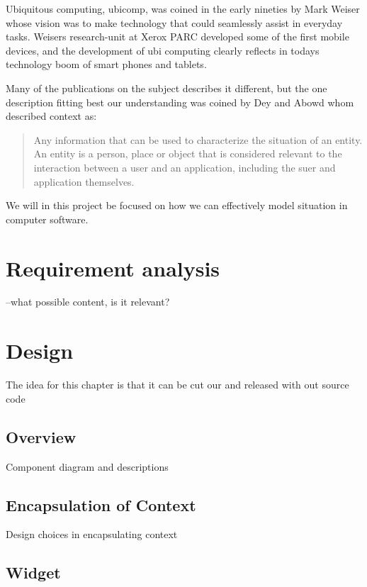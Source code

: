\documentclass[]{report}
\begin{document}
Ubiquitous computing, ubicomp, was coined in the early nineties by Mark Weiser whose vision was to make technology that could seamlessly assist in everyday tasks. Weisers research-unit at Xerox PARC developed some of the first mobile devices, and the development of ubi computing clearly reflects in todays technology boom of smart phones and tablets.

Many of the publications on the subject describes it different, but the one description fitting best our understanding was coined by Dey and Abowd whom described context as:


\blockquote{
	Any information that can be used to characterize the situation of an entity. An entity is a person, place or object that is considered relevant to the interaction between a user and an application, including the suer and application themselves. \cite{Dey and Abowd (2000)} 
} 

We will in this project be focused on how we can effectively model situation in computer software.






  

\chapter{Requirement analysis}

--what possible content, is it relevant?



\chapter{Design}
The idea for this chapter is that it can be cut our and released with out source code

\section{Overview}
Component diagram and descriptions

\section{Encapsulation of Context}
Design choices in encapsulating context

\section{Widget}
\end{document}
